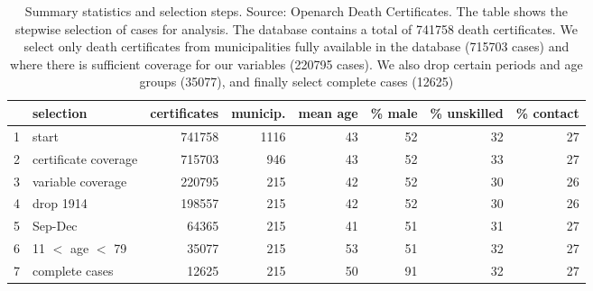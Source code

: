 \begin{table}[ht]
\centering
\begin{tabular}{rlrrrrrr}
  \hline
 & selection & certificates & municip. & mean age & \% male & \% unskilled & \% contact \\ 
  \hline
1 & start & 741758 & 1116 & 43 & 52 & 32 & 27 \\ 
  2 & certificate coverage & 715703 & 946 & 43 & 52 & 33 & 27 \\ 
  3 & variable coverage & 220795 & 215 & 42 & 52 & 30 & 26 \\ 
  4 & drop 1914 & 198557 & 215 & 42 & 52 & 30 & 26 \\ 
  5 & Sep-Dec & 64365 & 215 & 41 & 51 & 31 & 27 \\ 
  6 & 11 $<$ age $<$ 79 & 35077 & 215 & 53 & 51 & 32 & 27 \\ 
  7 & complete cases & 12625 & 215 & 50 & 91 & 32 & 27 \\ 
   \hline
\end{tabular}
\caption{Summary statistics and selection steps. Source: Openarch Death Certificates. The table shows the stepwise selection of cases for analysis. The database contains a total of 741758 death certificates. We select only death certificates from municipalities fully available in the database (715703 cases) and where there is sufficient coverage for our variables (220795 cases). We also drop certain periods and age groups (35077), and finally select complete cases (12625) } 
\label{sumselect}
\end{table}
